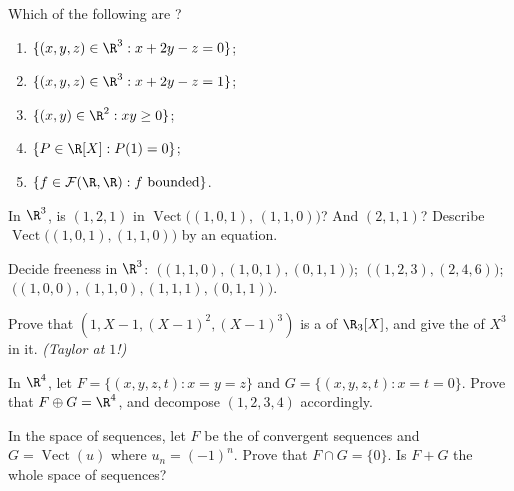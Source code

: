 \begin{exercise}[$\star$]\label{exo:b1:vspaces:1}
Which of the following are ?
\begin{enumerate}
  \item $\{(x, y, z) \in \R^3 : x + 2y - z = 0\}$;
  \item $\{(x, y, z) \in \R^3 : x + 2y - z = 1\}$;
  \item $\{(x, y) \in \R^2 : xy \geq 0\}$;
  \item $\{P \in \R[X] : P(1) = 0\}$;
  \item $\{f \in \mathcal{F}(\R,\R) : f \text{ bounded}\}$.
\end{enumerate}
\end{exercise}

\begin{exercise}[$\star$]\label{exo:b1:vspaces:2}
In $\R^3$, is $(1, 2, 1)$ in
$\operatorname{Vect}\bigl((1,0,1),\, (1,1,0)\bigr)$? And $(2, 1,
1)$? Describe $\operatorname{Vect}\bigl((1,0,1),(1,1,0)\bigr)$ by an
equation.
\end{exercise}

\begin{exercise}[$\star$]\label{exo:b1:vspaces:3}
Decide freeness in $\R^3$: $\;\bigl((1,1,0), (1,0,1),
(0,1,1)\bigr)$; $\;\bigl((1,2,3), (2,4,6)\bigr)$;
$\;\bigl((1,0,0), (1,1,0), (1,1,1), (0,1,1)\bigr)$.
\end{exercise}

\begin{exercise}[$\star$]\label{exo:b1:vspaces:4}
Prove that $(1, X - 1, (X-1)^2, (X-1)^3)$ is a  of $\R_3[X]$,
and give the  of $X^3$ in it. \emph{(Taylor at $1$!)}
\end{exercise}

\begin{exercise}[$\star\star$]\label{exo:b1:vspaces:5}
In $\R^4$, let $F = \{(x,y,z,t) : x = y = z\}$ and $G = \{(x,y,z,t)
: x = t = 0\}$. Prove that $F \oplus G = \R^4$, and decompose
$(1,2,3,4)$ accordingly.
\end{exercise}

\begin{exercise}[$\star\star$]\label{exo:b1:vspaces:6}
In the space of sequences, let $F$ be the  of convergent
sequences and $G = \operatorname{Vect}(u)$ where $u_n = (-1)^n$.
Prove that $F \cap G = \{0\}$. Is $F + G$ the whole space of
sequences?
\end{exercise}

